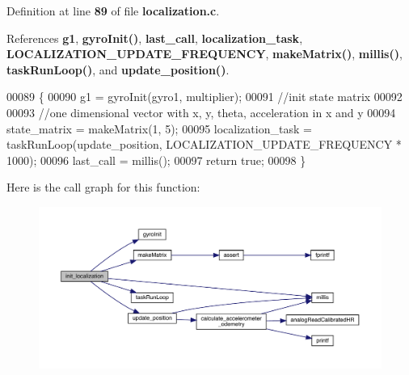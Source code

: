 Definition at line \textbf{ 89} of file \textbf{ localization.\+c}.



References \textbf{ g1}, \textbf{ gyro\+Init()}, \textbf{ last\+\_\+call}, \textbf{ localization\+\_\+task}, \textbf{ L\+O\+C\+A\+L\+I\+Z\+A\+T\+I\+O\+N\+\_\+\+U\+P\+D\+A\+T\+E\+\_\+\+F\+R\+E\+Q\+U\+E\+N\+CY}, \textbf{ make\+Matrix()}, \textbf{ millis()}, \textbf{ task\+Run\+Loop()}, and \textbf{ update\+\_\+position()}.


\begin{DoxyCode}
00089                                                                                                            
                    \{
00090   g1 = gyroInit(gyro1, multiplier);
00091   \textcolor{comment}{//init state matrix}
00092 
00093   \textcolor{comment}{//one dimensional vector with x, y, theta, acceleration in x and y}
00094   state_matrix = makeMatrix(1, 5);
00095   localization_task = taskRunLoop(update_position, LOCALIZATION_UPDATE_FREQUENCY * 1000);
00096   last_call = millis();
00097   \textcolor{keywordflow}{return} \textcolor{keyword}{true};
00098 \}
\end{DoxyCode}
Here is the call graph for this function\+:\nopagebreak
\begin{figure}[H]
\begin{center}
\leavevmode
\includegraphics[width=350pt]{localization_8h_afdd0147de6aa15957e9a125f9cd20578_cgraph}
\end{center}
\end{figure}
